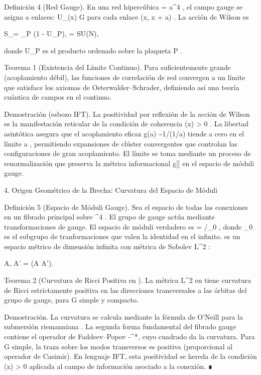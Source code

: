 \documentclass[12pt,a4paper]{book}
\begin{document}
Definición 4 (Red Gauge).
En una red hipercúbica  \Lambda = a^4 , el campo gauge se asigna a enlaces:  U_\mu(x) \in G  para cada enlace  (x, x + a\hat{\mu}) . La acción de Wilson es

S_\Lambda[U] = \beta \sum_P  (1 - U_P), \quad \beta =   SU(N),

donde  U_P  es el producto ordenado sobre la plaqueta  P .

Teorema 1 (Existencia del Límite Continuo).
Para  \beta  suficientemente grande (acoplamiento débil), las funciones de correlación de red convergen a un límite que satisface los axiomas de Osterwalder–Schrader, definiendo así una teoría cuántica de campos en el continuo.

Demostración (esbozo IFT). La positividad por reflexión de la acción de Wilson es la manifestación reticular de la condición de coherencia  \rho(x) > 0 . La libertad asintótica asegura que el acoplamiento eficaz  g(a) \sim 1/\ln(1/a\Lambda)  tiende a cero en el límite  a  , permitiendo expansiones de clúster convergentes que controlan las configuraciones de gran acoplamiento. El límite se toma mediante un proceso de renormalización que preserva la métrica informacional  g[\rho]  en el espacio de móduli gauge.

4. Origen Geométrico de la Brecha: Curvatura del Espacio de Móduli

Definición 5 (Espacio de Móduli Gauge).
Sea    el espacio de todas las conexiones en un fibrado principal sobre  ^4 . El grupo de gauge    actúa mediante transformaciones de gauge. El espacio de móduli verdadero es   = /_0 , donde  _0  es el subgrupo de tranformaciones que valen la identidad en el infinito.    es un espacio métrico de dimensión infinita con métrica de Sobolev  L^2 :

\langle \delta A, \delta A' \rangle = \int {}(\delta A \wedge * \delta A').

Teorema 2 (Curvatura de Ricci Positiva en   ).
La métrica  L^2  en    tiene curvatura de Ricci estrictamente positiva en las direcciones transversales a las órbitas del grupo de gauge, para  G  simple y compacto.

Demostración. La curvatura se calcula mediante la fórmula de O’Neill para la submersión riemanniana   \to {} . La segunda forma fundamental del fibrado gauge contiene el operador de Faddeev–Popov  -\nabla^*\nabla , cuyo cuadrado da la curvatura. Para  G  simple, la traza sobre los modos transversos es positiva (proporcional al operador de Casimir). En lenguaje IFT, esta positividad se hereda de la condición  \rho(x) > 0  aplicada al campo de información asociado a la conexión. ∎
\end{document}
